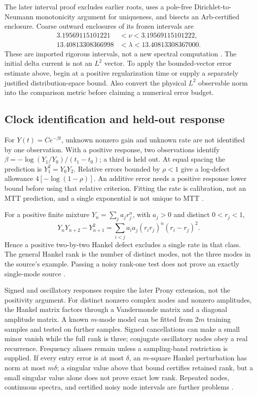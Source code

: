 \documentclass[11pt]{article}
\theoremstyle{definition}
\theoremstyle{remark}
\begin{document}
The later interval proof excludes earlier roots, uses a pole-free
Dirichlet-to-Neumann monotonicity argument for uniqueness, and bisects an
Arb-certified enclosure. Coarse outward enclosures of its frozen intervals
are
\[
\begin{split}
3.19569115101221&<\nu<3.19569115101222,\\
13.40813308366998&<\lambda<13.40813308367000.
\end{split}
\]
These are imported rigorous intervals, not a new spectral computation
\cite{beq34}. The initial delta current is not an \(L^2\) vector. To apply
the bounded-vector error estimate above, begin at a positive regularization
time or supply a separately justified distribution-space bound. Also
convert the physical \(L^2\) observable norm into the comparison metric
before claiming a numerical error budget.

\subsection{Clock identification and held-out response}
\label{sec:response-identifiability}
For \(Y(t)=C e^{-\beta t}\), unknown nonzero gain and unknown rate are not
identified by one observation. With a positive response, two observations
identify \(\beta=-\log(Y_1/Y_0)/(t_1-t_0)\); a third is held out.
At equal spacing the prediction is \(Y_1^2=Y_0Y_2\). Relative errors
bounded by \(\rho<1\) give a log-defect allowance
\(4[-\log(1-\rho)]\). An additive error needs a positive response lower
bound before using that relative criterion. Fitting the rate is calibration,
not an MTT prediction, and a single exponential is not unique to MTT
\cite{beq33}.

For a positive finite mixture \(Y_n=\sum_j a_jr_j^n\), with
\(a_j>0\) and distinct \(0<r_j<1\),
\[
Y_nY_{n+2}-Y_{n+1}^2
=\sum_{i<j}a_ia_j(r_ir_j)^n(r_i-r_j)^2.
\]
Hence a positive two-by-two Hankel defect excludes a single rate in that
class. The general Hankel rank is the number of distinct modes, not the
three modes in the source's example. Passing a noisy rank-one test does
not prove an exactly single-mode source \cite{beq36}.

Signed and oscillatory responses require the later Prony extension, not
the positivity argument. For distinct nonzero complex nodes and nonzero
amplitudes, the Hankel matrix factors through a Vandermonde matrix and a
diagonal amplitude matrix. A known \(m\)-mode model can be fitted from
\(2m\) training samples and tested on further samples. Signed cancellations
can make a small minor vanish while the full rank is three; conjugate
oscillatory nodes obey a real recurrence. Frequency aliases remain unless
a sampling-band restriction is supplied. If every entry error is at most
\(\delta\), an \(m\)-square Hankel perturbation has norm at most
\(m\delta\); a singular value above that bound certifies retained rank,
but a small singular value alone does not prove exact low rank. Repeated
nodes, continuous spectra, and certified noisy node intervals are further
problems \cite{beq39}.
\end{document}
